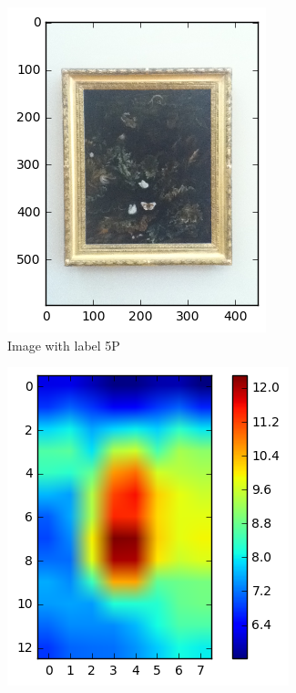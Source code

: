 \begin{figure}
\begin{subfigure}[b]{0.3\textwidth}
\includegraphics[width=\textwidth]{img/sample2_5P-0508.png}
\caption{Image with label 5P\label{fig:sample2_id}}
\end{subfigure}
\begin{subfigure}[b]{0.3\textwidth}
\includegraphics[width=\textwidth]{img/sample2_heatmap.png}

\end{subfigure}
\end{figure}
